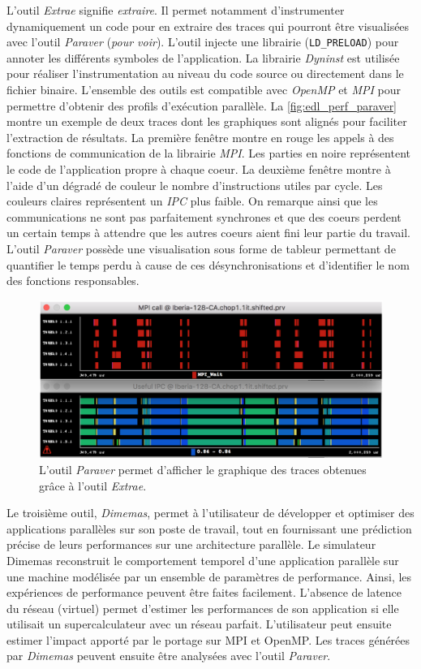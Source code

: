             L'outil \textit{Extrae} signifie \textit{extraire}. Il permet notamment d'instrumenter dynamiquement un code pour en extraire des traces qui pourront être visualisées avec l'outil \textit{Paraver} (\textit{pour voir}). L'outil injecte une librairie (\verb=LD_PRELOAD=) pour annoter les différents symboles de l'application. La librairie \textit{Dyninst} est utilisée pour réaliser l'instrumentation au niveau du code source ou directement dans le fichier binaire. L'ensemble des outils est compatible avec \textit{OpenMP} et \textit{MPI} pour permettre d'obtenir des profils d'exécution parallèle. La \autoref{fig:edl_perf_paraver} montre un exemple de deux traces dont les graphiques sont alignés pour faciliter l'extraction de résultats. La première fenêtre montre en rouge les appels à des fonctions de communication de la librairie \textit{MPI}. Les parties en noire représentent le code de l'application propre à chaque coeur. La deuxième fenêtre montre à l'aide d'un dégradé de couleur le nombre d'instructions utiles par cycle. Les couleurs claires représentent un \textit{IPC} plus faible. On remarque ainsi que les communications ne sont pas parfaitement synchrones et que des coeurs perdent un certain temps à attendre que les autres coeurs aient fini leur partie du travail. L'outil \textit{Paraver} possède une visualisation sous forme de tableur permettant de quantifier le temps perdu à cause de ces désynchronisations et d'identifier le nom des fonctions responsables.  
        
            \begin{figure}
            \center
            \includegraphics[width=12cm]{images/edl_perf_paraver.png}
            \caption{\label{fig:edl_perf_paraver} L'outil \textit{Paraver} permet d'afficher le graphique des traces obtenues grâce à l'outil \textit{Extrae}.}
            \end{figure}
            
            Le troisième outil, \textit{Dimemas}, permet à l'utilisateur de développer et optimiser des applications parallèles sur son poste de travail, tout en fournissant une prédiction précise de leurs performances sur une architecture parallèle. Le simulateur Dimemas reconstruit le comportement temporel d'une application parallèle sur une machine modélisée par un ensemble de paramètres de performance. Ainsi, les expériences de performance peuvent être faites facilement. L'absence de latence du réseau (virtuel) permet d'estimer les performances de son application si elle utilisait un supercalculateur avec un réseau parfait. L'utilisateur peut ensuite estimer l'impact apporté par le portage sur MPI et OpenMP. Les traces générées par \textit{Dimemas} peuvent ensuite être analysées avec l'outil \textit{Paraver}.


